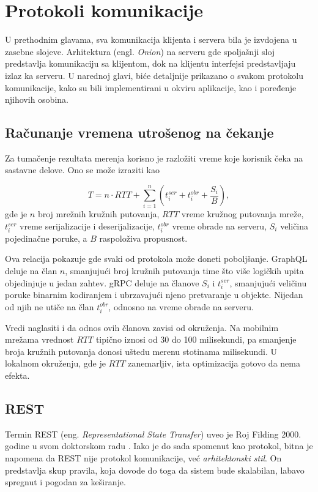 \documentclass[12pt,oneside]{memoir}
\begin{document}
\label{ssec:repozitorijum}


\label{ch:klijent}
\chapter{Protokoli komunikacije}
U prethodnim glavama, sva komunikacija klijenta i servera bila je izvdojena u zasebne slojeve. Arhitektura (engl. \textit{Onion})
 na serveru gde spoljašnji sloj predstavlja komunikaciju sa klijentom, dok na klijentu interfejsi 
predstavljaju izlaz ka serveru. U narednoj glavi, biće detaljnije prikazano o svakom protokolu komunikacije, kako 
su bili implementirani u okviru aplikacije, kao i poređenje njihovih osobina. 

\section{Računanje vremena utrošenog na čekanje}

Za tumačenje rezultata merenja korisno je razložiti vreme koje korisnik čeka na
sastavne delove. Ono se može izraziti kao

\begin{equation}
T = n \cdot \mathit{RTT} + \sum_{i=1}^{n}
\left( t^{\mathit{ser}}_i + t^{\mathit{obr}}_i + \frac{S_i}{B} \right),
\label{eq:latencija}
\end{equation}
gde je $n$ broj mrežnih kružnih putovanja, $\mathit{RTT}$ vreme kružnog
putovanja mreže, $t^{\mathit{ser}}_i$ vreme serijalizacije i deserijalizacije,
$t^{\mathit{obr}}_i$ vreme obrade na serveru, $S_i$ veličina pojedinačne
poruke, a $B$ raspoloživa propusnost.

Ova relacija pokazuje gde svaki od protokola može doneti poboljšanje. GraphQL
deluje na član $n$, smanjujući broj kružnih putovanja time što više logičkih
upita objedinjuje u jedan zahtev. gRPC deluje na članove $S_i$ i
$t^{\mathit{ser}}_i$, smanjujući veličinu poruke binarnim kodiranjem i
ubrzavajući njeno pretvaranje u objekte. Nijedan od njih ne utiče na član
$t^{\mathit{obr}}_i$, odnosno na vreme obrade na serveru.

Vredi naglasiti i da odnos ovih članova zavisi od okruženja. Na mobilnim
mrežama vrednost $\mathit{RTT}$ tipično iznosi od 30 do 100 milisekundi, pa
smanjenje broja kružnih putovanja donosi uštedu merenu stotinama milisekundi.
U lokalnom okruženju, gde je $\mathit{RTT}$ zanemarljiv, ista optimizacija
gotovo da nema efekta.

\section{REST}
Termin REST (eng. \textit{Representational State Transfer}) uveo je Roj Filding
2000. godine u svom doktorskom radu \cite{fielding2000}. Iako je do sada spomenut kao protokol, 
bitna je napomena da REST nije protokol komunikacije, već \emph{arhitektonski stil}. On predstavlja skup pravila, 
koja dovode do toga da sistem bude skalabilan, labavo spregnut i pogodan za keširanje. 
\end{document}
